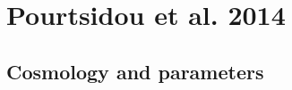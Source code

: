 \documentclass[12pt]{article}
\def\l{{\bf l}}
\def\il{{\tilde{\rm I}}}
\numberwithin{equation}{section}
\begin{document}
%
%

\section{Pourtsidou et al. 2014}
\subsection{Cosmology and parameters}
\end{document}
